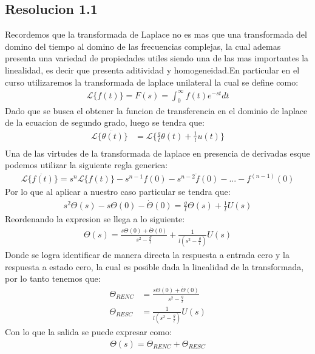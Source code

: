 \documentclass[
  11pt,
  letterpaper,
   addpoints,
   answers
  ]{exam}
\begin{document}
\begin{questions}
\begin{solution}
        \subsection*{Resolucion 1.1}
        Recordemos que la transformada de Laplace no es mas que una transformada del domino del tiempo al domino de las frecuencias complejas, la cual ademas presenta una variedad de propiedades utiles siendo una de las mas importantes la linealidad, es decir que presenta aditividad y homogeneidad.En particular en el curso utilizaremos la transformada de laplace unilateral la cual se define como:
        \begin{align}
            \mathcal{L}\{f(t)\} = F(s) = \int_{0}^{\infty} f(t)e^{-st}dt
        \end{align}
        Dado que se busca el obtener la funcion de transferencia en el dominio de laplace de la ecuacion de segundo grado, luego se tendra que:
        \begin{align}
            \mathcal{L}\{\ddot{\theta(t)}\} &= \mathcal{L}\{\frac{g}{l}\theta(t) +\frac{1}{l}u(t)\}\\
        \end{align}
        Una de las virtudes de la transformada de laplace en presencia de derivadas esque podemos utilizar la siguiente regla generica:
        \begin{align}
            \mathcal{L}\{\ddot{f(t)}\} = s^{n}\mathcal{L}\{f(t)\} - s^{n-1}f(0) - s^{n-2}\dot{f}(0) - ... - f^{(n-1)}(0)
        \end{align}
        Por lo que al aplicar a nuestro caso particular se tendra que:
        \begin{align}
         s^{2}\Theta(s) - s\Theta(0) - \dot{\Theta}(0) = \frac{g}{l}\Theta(s) + \frac{1}{l}U(s) 
        \end{align}
        Reordenando la expresion se llega a lo siguiente:
        \begin{align}
            \Theta(s) = \frac{s\Theta(0) + \dot\Theta(0) }{s^{2}-\frac{g}{l}} + \frac{1}{l(s^{2}-\frac{g}{l})}U(s)
        \end{align}
        Donde se logra identificar de manera directa la respuesta a entrada cero y la respuesta a estado cero, la cual es posible dada la linealidad de la transformada, por lo tanto tenemos que:
        \begin{align}
            \Theta_{RENC} &= \frac{s\Theta(0) + \dot\Theta(0) }{s^{2}-\frac{g}{l}}\\
            \Theta_{RESC} &= \frac{1}{l(s^{2}-\frac{g}{l})}U(s)
        \end{align}
        Con lo que la salida se puede expresar como:
        \begin{align}
            \Theta(s) = \Theta_{RENC} + \Theta_{RESC}
        \end{align}

\end{solution}
\end{questions}
\end{document}
